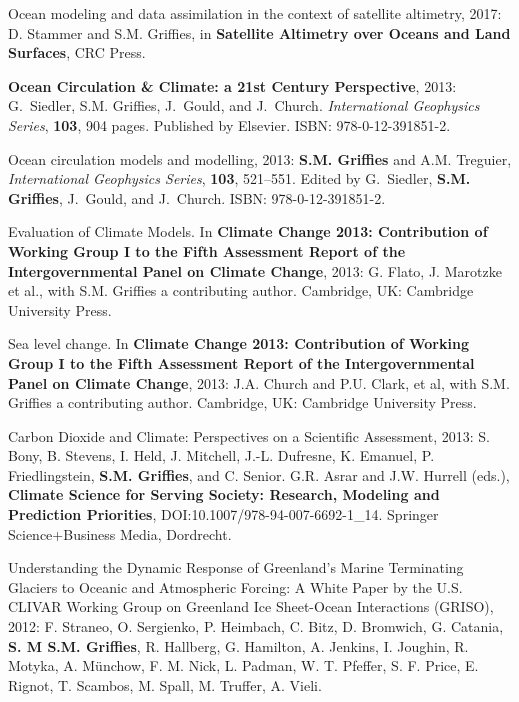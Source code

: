 \begin{etaremune}

\item Ocean modeling and data assimilation in the context of satellite altimetry, 2017: D. Stammer and S.M. Grif\/f\/ies, in  {\bf Satellite Altimetry over Oceans and Land Surfaces}, CRC Press.
  
\item {\bf Ocean Circulation \& Climate: a 21st Century Perspective},
  2013: G.\ Siedler, S.M. Grif\/f\/ies, J.\ Gould, and J.\ Church.
  {\it International Geophysics Series}, {\bf 103}, 904
  pages. Published by Elsevier.  ISBN: 978-0-12-391851-2.

\item Ocean circulation models and modelling, 2013: {\bf
    S.M. Grif\/f\/ies} and A.M. Treguier, {\it International Geophysics
    Series}, {\bf 103}, 521--551.  Edited by G.\ Siedler, {\bf
    S.M. Grif\/f\/ies}, J.\ Gould, and J.\ Church.  ISBN:
  978-0-12-391851-2.

\item Evaluation of Climate Models.  In {\bf Climate Change 2013:
    Contribution of Working Group I to the Fifth Assessment Report of
    the Intergovernmental Panel on Climate Change}, 2013: G. Flato,
  J. Marotzke et al., with S.M. Grif\/f\/ies a contributing
  author.   Cambridge, UK: Cambridge University Press.

\item Sea level change.  In {\bf Climate Change 2013: Contribution of
    Working Group I to the Fifth Assessment Report of the
    Intergovernmental Panel on Climate Change}, 2013: J.A. Church and
  P.U. Clark, et al, with S.M. Grif\/f\/ies a contributing
  author.  Cambridge, UK: Cambridge University Press.

\item Carbon Dioxide and Climate: Perspectives on a Scientific
  Assessment, 2013: S. Bony, B. Stevens, I. Held, J. Mitchell,
  J.-L. Dufresne, K. Emanuel, P. Friedlingstein, {\bf
    S.M. Grif\/f\/ies}, and C. Senior. G.R. Asrar and J.W. Hurrell
  (eds.), {\bf Climate Science for Serving Society: Research, Modeling
    and Prediction Priorities}, DOI:10.1007/978-94-007-6692-1\_14.
  Springer Science+Business Media, Dordrecht.

\item Understanding the Dynamic Response of Greenland’s Marine
  Terminating Glaciers to Oceanic and Atmospheric Forcing: A White
  Paper by the U.S. CLIVAR Working Group on Greenland Ice Sheet-Ocean
  Interactions (GRISO), 2012: F. Straneo, O. Sergienko, P. Heimbach,
  C. Bitz, D. Bromwich, G. Catania, {\bf S. M S.M. Grif\/f\/ies}, R.
  Hallberg, G. Hamilton, A. Jenkins, I. Joughin, R. Motyka,
  A. Münchow, F. M. Nick, L. Padman, W. T. Pfeffer, S. F. Price,
  E. Rignot, T. Scambos, M. Spall, M. Truffer, A. Vieli.


\end{etaremune}
